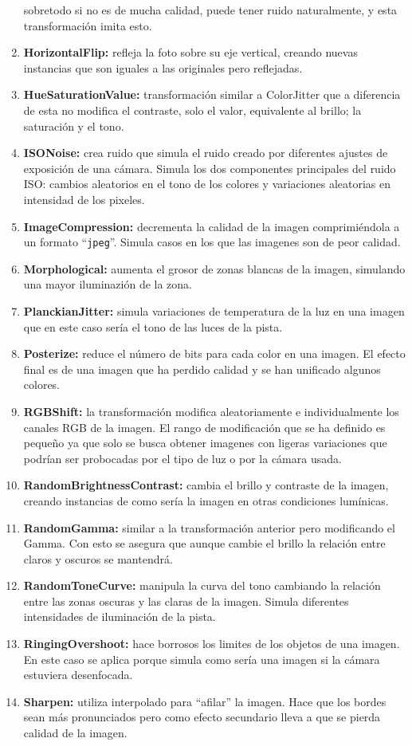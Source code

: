 \documentclass[12pt]{report} %
\begin{document}
\begin{enumerate}
    sobretodo si no es de mucha calidad, puede tener ruido naturalmente, y esta
    transformación imita esto.
    \item \textbf{HorizontalFlip:} refleja la foto
    sobre su eje vertical, creando nuevas instancias que son iguales a las
    originales pero reflejadas.
    \item \textbf{HueSaturationValue:}
    transformación similar a ColorJitter que a diferencia de esta no modifica
    el contraste, solo el valor, equivalente al brillo; la saturación y el
    tono.
    \item \textbf{ISONoise:} crea ruido que simula el ruido creado por
    diferentes ajustes de exposición de una cámara.  Simula los dos componentes
    principales del ruido ISO: cambios aleatorios en el tono de los colores y
    variaciones aleatorias en intensidad de los pixeles.
    \item \textbf{ImageCompression:} decrementa la calidad de la imagen
    comprimiéndola a un formato ``\verb!jpeg!''. Simula casos en los que las imagenes
    son de peor calidad.
    \item \textbf{Morphological:} aumenta el grosor de
    zonas blancas de la imagen, simulando una mayor iluminazión de la zona.
    \item \textbf{PlanckianJitter:} simula variaciones de temperatura de la luz
    en una imagen que en este caso sería el tono de las luces de la pista.
    \item \textbf{Posterize:} reduce el número de bits para cada color en una
    imagen. El efecto final es de una imagen que ha perdido calidad y se han
    unificado algunos colores.
    \item \textbf{RGBShift:} la transformación
    modifica aleatoriamente e individualmente los canales RGB de la imagen.  El
    rango de modificación que se ha definido es pequeño ya que solo se busca
    obtener imagenes con ligeras variaciones que podrían ser probocadas por el
    tipo de luz o por la cámara usada.
    \item \textbf{RandomBrightnessContrast:} cambia el brillo y contraste de la
    imagen, creando instancias de como sería la imagen en otras condiciones
    lumínicas.
    \item \textbf{RandomGamma:} similar a la transformación
    anterior pero modificando el Gamma. Con esto se asegura que aunque cambie
    el brillo la relación entre claros y oscuros se mantendrá.
    \item \textbf{RandomToneCurve:} manipula la curva del tono cambiando la relación
    entre las zonas oscuras y las claras de la imagen. Simula diferentes
    intensidades de iluminación de la pista.
    \item \textbf{RingingOvershoot:}
    hace borrosos los limites de los objetos de una imagen. En este caso se
    aplica porque simula como sería una imagen si la cámara estuviera
    desenfocada.
    \item \textbf{Sharpen:} utiliza interpolado para ``afilar'' la
    imagen. Hace que los bordes sean más pronunciados pero como efecto
    secundario lleva a que se pierda calidad de la imagen.
    \end{enumerate}
\end{document}
